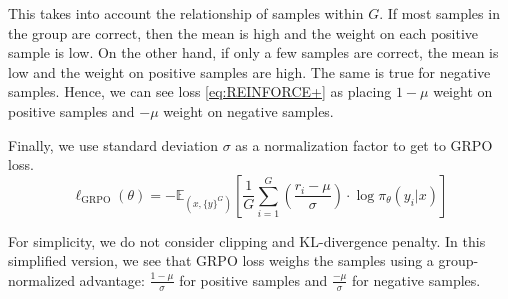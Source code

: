 \documentclass{article}
\newcommand{\todo}[1]{\textcolor{red}{TODO: #1}}
\begin{document}
This takes into account the relationship of samples within $G$. If most samples in the group are correct, then the mean is high and the weight on each positive sample is low. On the other hand, if only a few samples are correct, the mean is low and the weight on positive samples are high. The same is true for negative samples. Hence, we can see loss \ref{eq:REINFORCE+} as placing $1- \mu$ weight on positive samples and $-\mu$ weight on negative samples.


Finally, we use standard deviation $\sigma$ as a normalization factor to get to GRPO loss.
\begin{equation}
    \ell_{\text{GRPO}}(\theta) = - \mathbb{E}_{(x, \{y\}^G)} \left[ \frac{1}{G} \sum_{i = 1}^G \left( \frac{r_i - \mu}{\sigma} \right) \cdot \log \pi_\theta(y_i \vert x) \right]
    \label{eq:GRPO}
\end{equation}

For simplicity, we do not consider clipping and KL-divergence penalty. In this simplified version, we see that GRPO loss weighs the samples using a group-normalized advantage: $\frac{1- \mu}{\sigma}$ for positive samples and $\frac{-\mu}{\sigma}$ for negative samples.






\end{document}
